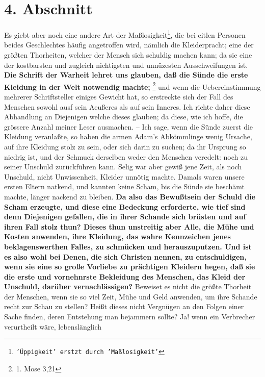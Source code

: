 \section{4. Abschnitt} \label{kap14_ab4}

Es giebt aber noch eine andere Art der Maßlosigkeit\footnote{\texttt{'Üppigkeit' erstzt durch 'Maßlosigkeit'}}, die bei eitlen Personen beides
Geschlechtes häufig angetroffen wird, nämlich die Kleiderpracht; eine der
größten Thorheiten, welcher der Mensch sich schuldig machen kann; da sie eine
der kostbarsten und zugleich nichtigsten und unnüzesten Ausschweifungen ist. \textbf{Die
Schrift der Warheit lehret uns glauben, daß die Sünde die erste Kleidung in der
Welt notwendig machte;}
\footnote{1. Mose 3,21}
und wenn die Uebereinstimmung
mehrerer Schriftsteller einiges Gewicht hat, so erstreckte sich der Fall des
Menschen sowohl ausf sein Aeußeres als auf sein Inneres. Ich richte daher diese
Abhandlung an Diejenigen welche dieses glauben; da diese, wie ich hoffe, die
grössere Anzahl meiner Leser ausmachen. -- Ich sage, wenn die Sünde zuerst die
Kleidung veranlaßte, so haben die armen Adam’s Abkömmlinge wenig Ursache, auf
ihre Kleidung stolz zu sein, oder sich darin zu suchen; da ihr Ursprung so
niedrig ist, und der Schmuck derselben weder den Menschen veredelt: noch zu
seiner Unschuld zurückführen kann. Selig war aber gewiß jene Zeit, als noch
Unschuld, nicht Unwissenheit, Kleider unnötig machte. Damals waren unsere ersten
Eltern natkend, und kannten keine Scham, bis die Sünde sie beschämt machte,
länger nackend zu bleiben. \textbf{Da also das Bewußtsein der Schuld die Scham erzeugte,
und diese eine Bedeckung erforderte, wie tief sind denn Diejenigen gefallen, die
in ihrer Schande sich brüsten und auf ihren Fall stolz thun? Dieses thun
unstreitig aber Alle, die Mühe und Kosten anwenden, ihre Kleidung, das wahre
Kennzeichen jenes beklagenswerthen Falles, zu schmücken und herauszuputzen. Und
ist es also wohl bei Denen, die sich Christen nennen, zu entschuldigen, wenn sie
eine so große Vorliebe zu prächtigen Kleidern hegen, daß sie die erste und
vornehnrste Bekleidung des Menschen, das Kleid der Unschuld, darüber
vernachlässigen?} Beweiset es nicht die größte Thorheit der Menschen, wenn sie so
viel Zeit, Mühe und Geld anwenden, um ihre Schande recht zur Schau zu stellen?
Heißt dieses nicht Vergnügen an den Folgen einer Sache finden, deren Entstehung
man bejammern sollte? Ja! wenn ein Verbrecher verurtheilt wäre, lebenslänglich
